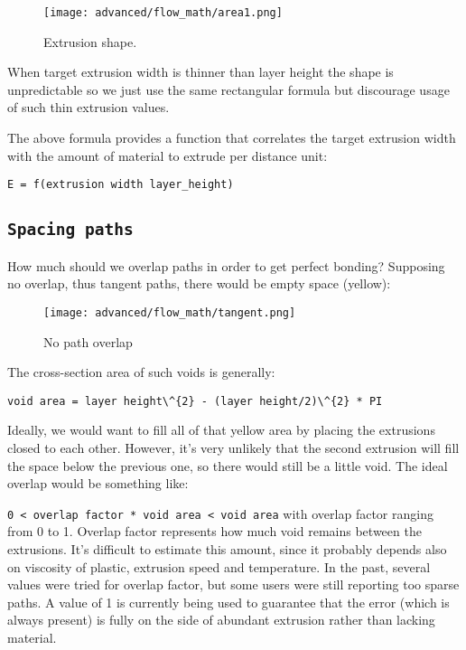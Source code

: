 \begin{figure}[H]
\centering
\texttt{[image: advanced/flow\_math/area1.png]}
\caption{Extrusion shape.}
\label{fig:area1}
\end{figure}

When target extrusion width is thinner than layer height the shape is unpredictable so we just use the same rectangular formula but discourage usage of such thin extrusion values.

The above formula provides a function that correlates the target extrusion width with the amount of material to extrude per distance unit:

\par \verb|E = f(extrusion width layer_height)|

\subsection{\texttt{Spacing paths}}
\label{sec:spacing_paths}

How much should we overlap paths in order to get perfect bonding?
Supposing no overlap, thus tangent paths, there would be empty space (yellow):

\begin{figure}[H]
\centering
\texttt{[image: advanced/flow\_math/tangent.png]}
\caption{No path overlap}
\label{fig:tangent}
\end{figure}

The cross-section area of such voids is generally:

\par \verb|void area = layer height\^{2} - (layer height/2)\^{2} * PI|

Ideally, we would want to fill all of that yellow area by placing the extrusions closed to each other. However, it's very unlikely that the second extrusion will fill the space below the previous one, so there would still be a little void. The ideal overlap would be something like:
\par \verb|0 < overlap factor * void area < void area|
with overlap factor ranging from 0 to 1. Overlap factor represents how much void remains between the extrusions. It's difficult to estimate this amount, since it probably depends also on viscosity of plastic, extrusion speed and temperature. In the past, several values were tried for overlap factor, but some users were still reporting too sparse paths. A value of 1 is currently being used to guarantee that the error (which is always present) is fully on the side of abundant extrusion rather than lacking material.

